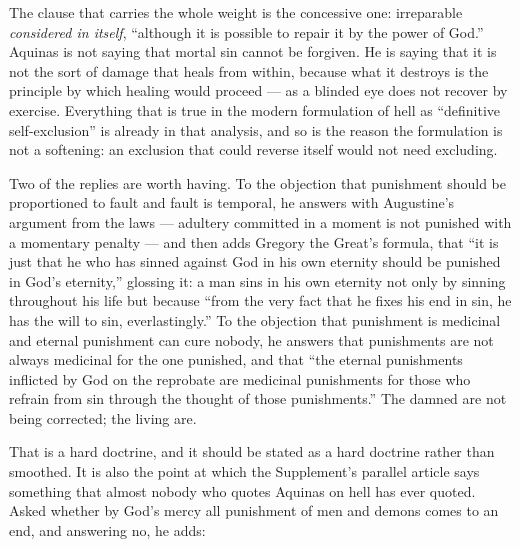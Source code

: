 The clause that carries the whole weight is the concessive one: irreparable \emph{considered in itself}, ``although it is possible to repair it by the power of God.'' Aquinas is not saying that mortal sin cannot be forgiven. He is saying that it is not the sort of damage that heals from within, because what it destroys is the principle by which healing would proceed --- as a blinded eye does not recover by exercise. Everything that is true in the modern formulation of hell as ``definitive self-exclusion'' is already in that analysis, and so is the reason the formulation is not a softening: an exclusion that could reverse itself would not need excluding.

Two of the replies are worth having. To the objection that punishment should be proportioned to fault and fault is temporal, he answers with Augustine's argument from the laws --- adultery committed in a moment is not punished with a momentary penalty --- and then adds Gregory the Great's formula, that ``it is just that he who has sinned against God in his own eternity should be punished in God's eternity,'' glossing it: a man sins in his own eternity not only by sinning throughout his life but because ``from the very fact that he fixes his end in sin, he has the will to sin, everlastingly.'' To the objection that punishment is medicinal and eternal punishment can cure nobody, he answers that punishments are not always medicinal for the one punished, and that ``the eternal punishments inflicted by God on the reprobate are medicinal punishments for those who refrain from sin through the thought of those punishments.'' The damned are not being corrected; the living are.

That is a hard doctrine, and it should be stated as a hard doctrine rather than smoothed. It is also the point at which the Supplement's parallel article says something that almost nobody who quotes Aquinas on hell has ever quoted. Asked whether by God's mercy all punishment of men and demons comes to an end, and answering no, he adds:

